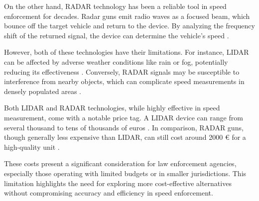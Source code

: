 On the other hand, RADAR technology has been a reliable tool in speed enforcement for decades. Radar guns emit radio waves as a focused beam, which bounce off the target vehicle and return to the device. By analyzing the frequency shift of the returned signal, the device can determine the vehicle's speed \cite{Policeradar}.

However, both of these technologies have their limitations. For instance, LIDAR can be affected by adverse weather conditions like rain or fog, potentially reducing its effectiveness \cite{dressig}. Conversely, RADAR signals may be susceptible to interference from nearby objects, which can complicate speed measurements in densely populated areas \cite{Hossain}.

Both LIDAR and RADAR technologies, while highly effective in speed measurement, come with a notable price tag. A LIDAR device can range from several thousand to tens of thousands of euros \cite{ProLaser4}. In comparison, RADAR guns, though generally less expensive than LIDAR, can still cost around 2000 € for a high-quality unit \cite{Danasafety}.

These costs present a significant consideration for law enforcement agencies, especially those operating with limited budgets or in smaller jurisdictions. This limitation highlights the need for exploring more cost-effective alternatives without compromising accuracy and efficiency in speed enforcement.

